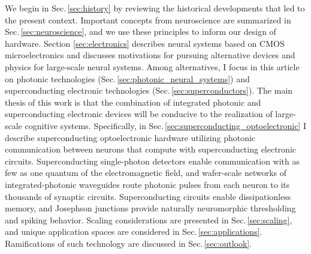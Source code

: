 We begin in Sec.\,\ref{sec:history} by reviewing the historical developments that led to the present context. Important concepts from neuroscience are summarized in Sec.\,\ref{sec:neuroscience}, and we use these principles to inform our design of hardware. Section \ref{sec:electronics} describes neural systems based on CMOS microelectronics and discusses motivations for pursuing alternative devices and physics for large-scale neural systems. Among alternatives, I focus in this article on photonic technologies (Sec.\,\ref{sec:photonic_neural_systems}) and superconducting electronic technologies (Sec.\,\ref{sec:superconductors}). The main thesis of this work is that the combination of integrated photonic and superconducting electronic devices will be conducive to the realization of large-scale cognitive systems. Specifically, in Sec.\,\ref{sec:superconducting_optoelectronic} I describe superconducting optoelectronic hardware utilizing photonic communication between neurons that compute with superconducting electronic circuits. Superconducting single-photon detectors enable communication with as few as one quantum of the electromagnetic field, and wafer-scale networks of integrated-photonic waveguides route photonic pulses from each neuron to its thousands of synaptic circuits. Superconducting circuits enable dissipationless memory, and Josephson junctions provide naturally neuromorphic thresholding and spiking behavior. Scaling considerations are presented in Sec.\,\ref{sec:scaling}, and unique application spaces are considered in Sec.\,\ref{sec:applications}. Ramifications of such technology are discussed in Sec.\,\ref{sec:outlook}.


